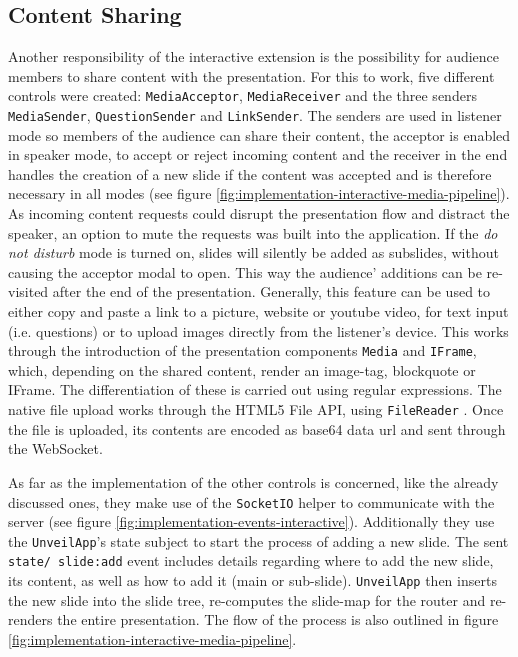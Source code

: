 \subsection{Content Sharing}
\label{sec:implementation-interactive-media}
Another responsibility of the interactive extension is the possibility for audience members to share content with the presentation. For this to work, five different controls were created: \texttt{MediaAcceptor}, \texttt{MediaReceiver} and the three senders \texttt{MediaSender}, \texttt{QuestionSender} and \texttt{LinkSender}. The senders are used in listener mode so members of the audience can share their content, the acceptor is enabled in speaker mode, to accept or reject incoming content and the receiver in the end handles the creation of a new slide if the content was accepted and is therefore necessary in all modes (see figure \ref{fig:implementation-interactive-media-pipeline}). As incoming content requests could disrupt the presentation flow and distract the speaker, an option to mute the requests was built into the application. If the \emph{do not disturb} mode is turned on, slides will silently be added as subslides, without causing the acceptor modal to open. This way the audience' additions can be re-visited after the end of the presentation. Generally, this feature can be used to either copy and paste a link to a picture, website or youtube video, for text input (i.e. questions) or to upload images directly from the listener's device. This works through the introduction of the presentation components \texttt{Media} and \texttt{IFrame}, which, depending on the shared content, render an image-tag, blockquote or IFrame. The differentiation of these is carried out using regular expressions. The native file upload works through the HTML5 File API, using \texttt{FileReader} \cite{file-api}. Once the file is uploaded, its contents are encoded as base64 data url and sent through the WebSocket.

As far as the implementation of the other controls is concerned, like the already discussed ones, they make use of the \texttt{SocketIO} helper to communicate with the server (see figure \ref{fig:implementation-events-interactive}). Additionally they use the \texttt{UnveilApp}'s state subject to start the process of adding a new slide. The sent \texttt{state/ slide:add} event includes details regarding where to add the new slide, its content, as well as how to add it (main or sub-slide). \texttt{UnveilApp} then inserts the new slide into the slide tree, re-computes the slide-map for the router and re-renders the entire presentation. The flow of the process is also outlined in figure \ref{fig:implementation-interactive-media-pipeline}.

